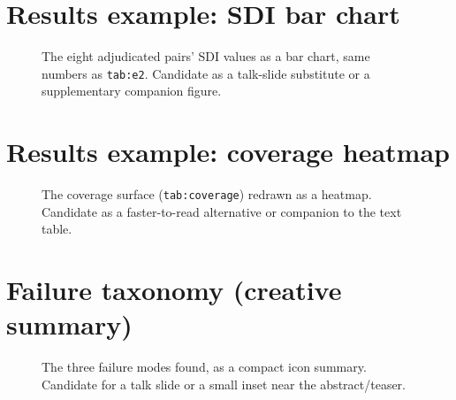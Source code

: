 \documentclass[10pt,letterpaper]{article}
\begin{document}
\clearpage
\section{Results example: SDI bar chart}
\begin{figure}[h]\centering
\resizebox{0.9\textwidth}{!}{}
\caption{The eight adjudicated pairs' SDI values as a bar chart, same
numbers as \texttt{tab:e2}. Candidate as a talk-slide substitute or a
supplementary companion figure.}
\end{figure}

\clearpage
\section{Results example: coverage heatmap}
\begin{figure}[h]\centering
\resizebox{0.75\textwidth}{!}{}
\caption{The coverage surface (\texttt{tab:coverage}) redrawn as a
heatmap. Candidate as a faster-to-read alternative or companion to the
text table.}
\end{figure}

\clearpage
\section{Failure taxonomy (creative summary)}
\begin{figure}[h]\centering
\resizebox{\textwidth}{!}{}
\caption{The three failure modes found, as a compact icon summary.
Candidate for a talk slide or a small inset near the abstract/teaser.}
\end{figure}
\end{document}
